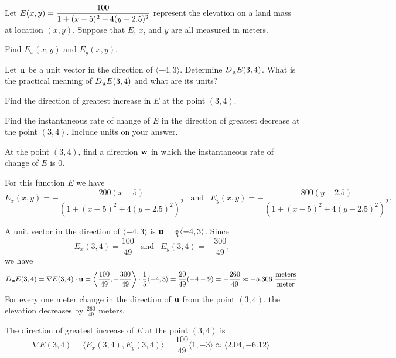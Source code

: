 \begin{exercises} 


\item Let $E(x,y) = \displaystyle \frac{100}{1+(x-5)^2 + 4(y-2.5)^2}$ represent the elevation on a land mass at location $(x,y)$.  Suppose that $E$, $x$, and $y$ are all measured in meters.
    \ba
    \item Find $E_x(x,y)$ and $E_y(x,y)$.

    \item Let $\mathbf{u}$ be a unit vector in the direction of $\langle -4,3 \rangle$.  Determine $D_{\mathbf{u}} E(3,4)$.  What is the practical meaning of $D_{\mathbf{u}} E(3,4)$ and what are its units?

    \item Find the direction of greatest increase in $E$ at the point $(3,4)$.

    \item Find the instantaneous rate of change of $E$ in the direction of greatest decrease at the point $(3,4)$.  Include units on your answer.
    
    \item At the point $(3,4)$, find a direction $\mathbf{w}$ in which the instantaneous rate of change of $E$ is 0.

    \ea

\begin{exerciseSolution}
\ba 
\item For this function $E$ we have 
\[E_x(x,y) = -\frac{200(x-5)}{(1+(x-5)^2 + 4(y-2.5)^2)^2} \ \ \text{ and } \ \ E_y(x,y) = -\frac{800(y-2.5)}{(1+(x-5)^2 + 4(y-2.5)^2)^2}.\]

\item A unit vector in the direction of $\langle -4,3 \rangle$ is $\mathbf{u} = \frac{1}{5} \langle -4, 3 \rangle$. Since
\[E_x(3,4) = \frac{100}{49} \ \ \text{ and } \ \ E_y(3,4) = -\frac{300}{49},\]
we have
\[D_{\vu} E(3,4) = \nabla E(3,4) \cdot \vu = \left\langle \frac{100}{49}, -\frac{300}{49} \right\rangle \cdot \frac{1}{5} \langle -4,3 \rangle = \frac{20}{49} (-4 - 9) = -\frac{260}{49} \approx -5.306 \ \frac{\text{meters}}{\text{meter}}.\]
For every one meter change in the direction of $\mathbf{u}$ from the point $(3,4)$, the elevation decreases by $\frac{260}{49}$ meters. 
 
\item The direction of greatest increase of $E$ at the point $(3,4)$ is 
\[\nabla E (3,4) = \langle E_x(3,4), E_y(3,4) \rangle = \frac{100}{49} \langle 1, -3 \rangle \approx \langle 2.04, -6.12 \rangle.\]


\end{exerciseSolution}
\end{exercises}
